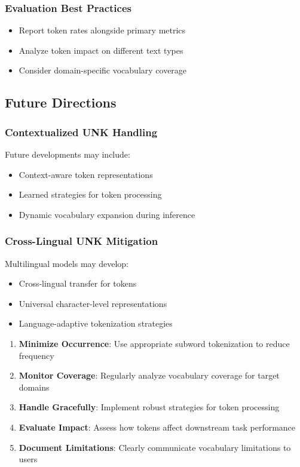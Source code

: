\subsubsection{Evaluation Best Practices}
\begin{itemize}
\item Report \unk{} token rates alongside primary metrics
\item Analyze \unk{} token impact on different text types
\item Consider domain-specific vocabulary coverage
\end{itemize}

\subsection{Future Directions}

\subsubsection{Contextualized UNK Handling}
Future developments may include:
\begin{itemize}
\item Context-aware \unk{} token representations
\item Learned strategies for \unk{} token processing
\item Dynamic vocabulary expansion during inference
\end{itemize}

\subsubsection{Cross-Lingual UNK Mitigation}
Multilingual models may develop:
\begin{itemize}
\item Cross-lingual transfer for \unk{} tokens
\item Universal character-level representations
\item Language-adaptive tokenization strategies
\end{itemize}

\begin{principle}
\begin{enumerate}
\item \textbf{Minimize Occurrence}: Use appropriate subword tokenization to reduce \unk{} frequency
\item \textbf{Monitor Coverage}: Regularly analyze vocabulary coverage for target domains
\item \textbf{Handle Gracefully}: Implement robust strategies for \unk{} token processing
\item \textbf{Evaluate Impact}: Assess how \unk{} tokens affect downstream task performance
\item \textbf{Document Limitations}: Clearly communicate vocabulary limitations to users
\end{enumerate}
\end{principle}


